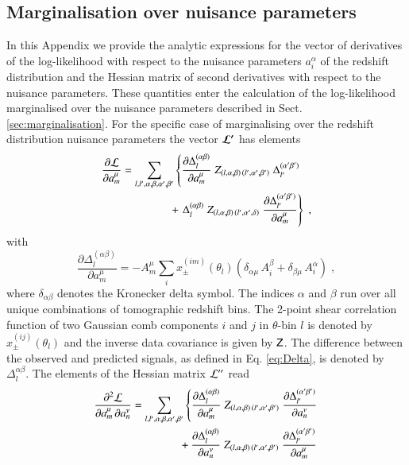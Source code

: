 \documentclass{aa}
\newcommand{\eq}[1]{\begin{equation}  #1 \end{equation}}
\newcommand{\eqa}[1]{\begin{align}   #1 \end{align}}
\newcommand{\br}[1]{\left( #1 \right)}
\newcommand{\nn}{\nonumber}
\begin{document}




\begin{appendix} 
\section{Marginalisation over nuisance parameters}
\label{ap:derivatives}
In this Appendix we provide the analytic expressions for the vector of derivatives of the log-likelihood with respect to the nuisance parameters $a_i^\alpha$ of the redshift distribution and the Hessian matrix of second derivatives with respect to the nuisance parameters. These quantities enter the calculation of the log-likelihood marginalised over the nuisance parameters described in Sect. \ref{sec:marginalisation}.
For the specific case of marginalising over the redshift distribution nuisance parameters the vector $\boldsymbol{\cal L^\prime}$ has elements
\eqa{
\frac{\partial {\cal L}}{\partial a_m^\mu} &= \sum_{l,l',\alpha,\beta,\alpha',\beta'}  \left\{ \frac{\partial \Delta_l^{(\alpha \beta)}}{\partial a_m^\mu}\; Z_{(l,\alpha,\beta) \,  (l',\alpha',\beta')}\; \Delta_{l'}^{(\alpha' \beta')} \right. \\ \nn
& \hspace*{1.5cm} + \left. \Delta_l^{(\alpha \beta)}\; Z_{(l,\alpha,\beta) \,  (l',\alpha',\delta)}\; \frac{\partial \Delta_{l'}^{(\alpha' \beta')}}{\partial a_m^\mu} \right\}\;,
}
with
\eq{
\frac{\partial \Delta_l^{(\alpha \beta)}}{\partial a_m^\mu} = - A_m^\mu \sum_i x_\pm^{(im)}(\theta_l) \br{\delta_{\alpha \mu}\, A_i^\beta + \delta_{\beta \mu}\, A_i^\alpha}\;,
}
where $\delta_{\alpha \beta}$ denotes the Kronecker delta symbol. The indices $\alpha$ and $\beta$ run over all unique combinations of tomographic redshift bins. The 2-point shear correlation function of two Gaussian comb components $i$ and $j$ in $\theta$-bin $l$ is denoted by $x_\pm^{(ij)}(\theta_l)$ and the inverse data covariance is given by $\mathsf{Z}$. The difference between the observed and predicted signals, as defined in Eq. \eqref{eq:Delta}, is denoted by $\Delta_l^{\alpha\beta}$.
The elements of the Hessian matrix ${\cal L^{\prime\prime}}$ read
\eqa{
\label{eq:hessian}
\frac{\partial^2 {\cal L}}{\partial a_m^\mu\, \partial a_n^\nu} &= \sum_{l,l',\alpha,\beta,\alpha',\beta'} 
\left\{ 
\frac{\partial \Delta_l^{(\alpha \beta)}}{\partial a_m^\mu}\; Z_{(l,\alpha,\beta) \,  (l',\alpha',\beta')}\; \frac{\partial \Delta_{l'}^{(\alpha' \beta')}}{\partial a_n^\nu}  \right. \\ \nn
&\hspace*{1.5cm}+ \frac{\partial \Delta_l^{(\alpha \beta)}}{\partial a_n^\nu}\; Z_{(l,\alpha,\beta) \,  (l',\alpha',\beta')}\; \frac{\partial \Delta_{l'}^{(\alpha' \beta')}}{\partial a_m^\mu} \\ \nn
}
\end{appendix}
\end{document}
